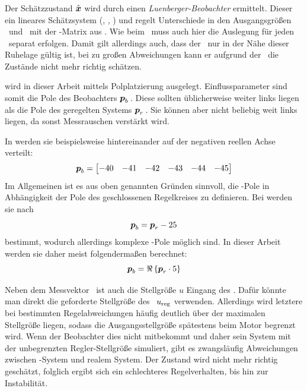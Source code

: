 \subsubsection{\beob}\label{subsec:beob}
Der Schätzzustand $\hat{\boldsymbol{x}}$ wird durch einen \emph{Luenberger-Beobachter} ermittelt. 
Dieser  ein lineares Schätzsystem (, , ) und regelt Unterschiede in den Ausgangsgrößen \vey\ und \veyd\ mit der \beob-Matrix  aus \cite{AdamyRT2}. 
Wie beim \zsr\ muss auch hier die Auslegung für jeden \ap\ separat erfolgen.
Damit gilt allerdings auch, dass der \beob\ nur in der Nähe dieser Ruhelage gültig ist, bei zu großen Abweichungen kann er aufgrund der \lin\ die Zustände nicht mehr richtig schätzen.

 wird in dieser Arbeit mittels Polplatzierung ausgelegt. 
Einflussparameter sind somit die Pole des Beobachters $\boldsymbol{p}_b$\,. 
Diese sollten üblicherweise weiter links liegen als die Pole des geregelten Systems $\boldsymbol{p}_r$\,. 
Sie können aber nicht beliebig weit links liegen, da sonst Messrauschen verstärkt wird.

In \cite{brehl} werden sie beispielsweise hintereinander auf der negativen reellen Achse verteilt:
	\[
	\boldsymbol{p}_b=\begin{bmatrix}
		-40 & -41 & -42 & -43 & -44 & -45
	\end{bmatrix}
\]
Im Allgemeinen ist es aus oben genannten Gründen sinnvoll, die \beob-Pole in Abhängigkeit der Pole des geschlossenen Regelkreises zu definieren.
Bei \cite{chang} werden sie nach
	\[
	\boldsymbol{p}_b = \boldsymbol{p}_r - 25
\]
bestimmt, wodurch allerdings komplexe \beob-Pole möglich sind. In dieser Arbeit werden sie daher meist folgendermaßen berechnet:
	\[
	\boldsymbol{p}_b = \Re\left\{{\boldsymbol{p}_r \cdot 5}\right\}
\]

Neben dem Messvektor \vey\ ist auch die Stellgröße $u$ Eingang des \beob. 
Dafür könnte man direkt die geforderte Stellgröße des \zsr\ $u_{\mathrm{reg}}$ verwenden.
Allerdings wird letztere bei bestimmten Regelabweichungen häufig deutlich über der maximalen Stellgröße liegen, sodass die Ausgangsstellgröße spätestens beim Motor begrenzt wird.
Wenn der Beobachter dies nicht mitbekommt und daher sein System mit der unbegrenzten Regler-Stellgröße simuliert, gibt es zwangsläufig Abweichungen zwischen \beob-System und realem System.
Der Zustand wird nicht mehr richtig geschätzt, folglich ergibt sich ein schlechteres Regelverhalten, bis hin zur Instabilität.

